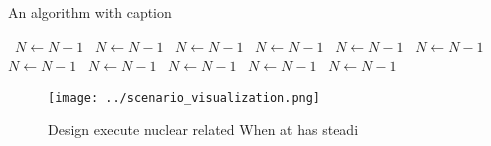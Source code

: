 \documentclass[a4paper]{article}
\begin{document}
\begin{algorithm}
\caption{An algorithm with caption}
\begin{algorithmic}
\    \State $N \gets N - 1$
\    \State $N \gets N - 1$
\    \State $N \gets N - 1$
\    \State $N \gets N - 1$
\    \State $N \gets N - 1$
\    \State $N \gets N - 1$
\    \State $N \gets N - 1$
\    \State $N \gets N - 1$
\    \State $N \gets N - 1$
\    \State $N \gets N - 1$
\    \State $N \gets N - 1$
\EndWhile
\end{algorithmic}
\end{algorithm}

\begin{figure}
\centering
\texttt{[image: ../scenario\_visualization.png]}
\caption{Design execute nuclear related When at has steadi
}
\end{figure}
 
\end{document}
